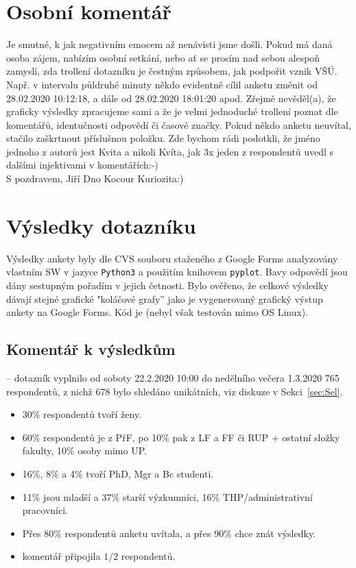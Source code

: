 \documentclass[a4paper,twoside]{article}
\begin{document}
\section{Osobní komentář}
Je smutné, k jak negativním emocem až nenávisti jsme došli.
Pokud má daná osoba zájem, nabízím osobní setkání, nebo ať se prosím nad sebou alespoň zamyslí, zda trollení dotazníku je čestným způsobem, jak podpořit vznik VŠÚ. Např. v intervalu půldruhé minuty někdo evidentně cílil anketu změnit od 28.02.2020 10:12:18, a dále od 28.02.2020 18:01:20 apod. Zřejmě nevěděl(a), že graficky výsledky zpracujeme sami a že je velmi jednoduché trollení poznat dle komentářů, identučnosti odpovědí či časové značky.
Pokud někdo anketu neuvítal, stačilo zaškrtnout příslušnou položku. Zde bychom rádi podotkli, že jméno jednoho z autorů jest Kvita a nikoli Kvíta, jak 3x jeden z respondentů uvedl s dalšími injektivami v komentářích:-) \\ S pozdravem, Jiří Dno Kocour Kuriozita:)

\section{Výsledky dotazníku}
Výsledky ankety byly dle CVS souboru staženého z Google Forms analyzovány vlastním SW v jazyce {\tt Python3} a použitím knihovem {\tt pyplot}.
Bavy odpovědí jsou dány sestupným pořadím v jejich četnosti.
Bylo ověřeno, že celkové výsledky dávají stejné grafické "koláčové grafy'' jako je vygenerovaný grafický výstup ankety na Google Forms.
Kód je  (nebyl však testován mimo OS Linux).

\subsection{Komentář k výsledkům}

 -- dotazník vyplnilo od soboty 22.2.2020 10:00 do nedělního večera 1.3.2020 765 respondentů, z nichž 678 bylo shledáno unikátních, viz diskuze v Sekci~\ref{sec:Sel}.
\begin{itemize}
  \item 30\% respondentů tvoří ženy.
  \item 60\% respondentů je z PřF, po 10\% pak z LF a FF či RUP + ostatní složky fakulty, 10\% osoby mimo UP.
  \item 16\%, 8\% a 4\% tvoří PhD, Mgr a Bc studenti.
  \item 11\% jsou mladší a 37\% starší výzkumníci, 16\% THP/administrativní pracovníci.
  \item Přes 80\% respondentů anketu uvítala, a přes 90\% chce znát výsledky.
  \item komentář připojila $1/2$ respondentů.
\end{itemize}
\end{document}
